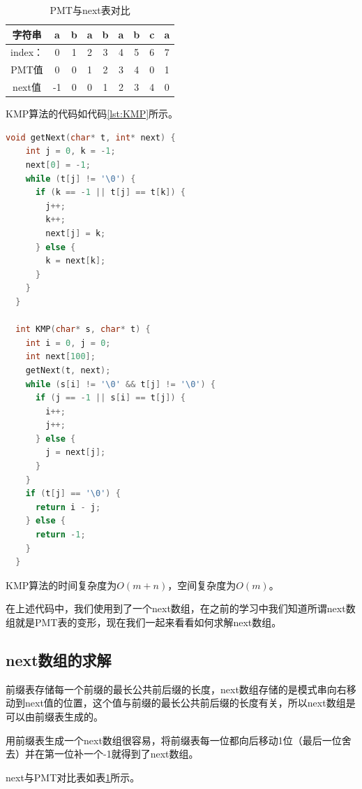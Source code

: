 \documentclass[lang=cn,newtx,10pt,scheme=chinese]{elegantbook}
\begin{document}
\begin{table}[htbp]
  \centering
  \caption{PMT与next表对比}
  \begin{tabular}{|c|c|c|c|c|c|c|c|c|}
    \hline
    字符串 & a & b & a & b & a & b & c & a \\
    \hline
    index： & 0 & 1 & 2 & 3 & 4 & 5 & 6 & 7 \\
    \hline
    PMT值 & 0 & 0 & 1 & 2 & 3 & 4 & 0 & 1 \\
    \hline
    next值 & -1 & 0 & 0 & 1 & 2 & 3 & 4 & 0 \\
    \hline
  \end{tabular}
  \label{table:next-PMT}
\end{table}

KMP算法的代码如代码\ref{lst:KMP}所示。

\begin{lstlisting}[language=C++, caption={KMP算法示例代码}, label={lst:KMP}]
  void getNext(char* t, int* next) {
    int j = 0, k = -1;
    next[0] = -1;
    while (t[j] != '\0') {
      if (k == -1 || t[j] == t[k]) {
        j++;
        k++;
        next[j] = k;
      } else {
        k = next[k];
      }
    }
  }

  int KMP(char* s, char* t) {
    int i = 0, j = 0;
    int next[100];
    getNext(t, next);
    while (s[i] != '\0' && t[j] != '\0') {
      if (j == -1 || s[i] == t[j]) {
        i++;
        j++;
      } else {
        j = next[j];
      }
    }
    if (t[j] == '\0') {
      return i - j;
    } else {
      return -1;
    }
  }

\end{lstlisting}


KMP算法的时间复杂度为$O(m+n)$，空间复杂度为$O(m)$。


在上述代码中，我们使用到了一个next数组，在之前的学习中我们知道所谓next数组就是PMT表的变形，现在我们一起来看看如何求解next数组。

\subsection{next数组的求解}

前缀表存储每一个前缀的最长公共前后缀的长度，next数组存储的是模式串向右移动到next值的位置，这个值与前缀的最长公共前后缀的长度有关，所以next数组是可以由前缀表生成的。

用前缀表生成一个next数组很容易，将前缀表每一位都向后移动1位（最后一位舍去）并在第一位补一个-1就得到了next数组。

next与PMT对比表如表\ref{table:next-PMT}所示。
\end{document}
